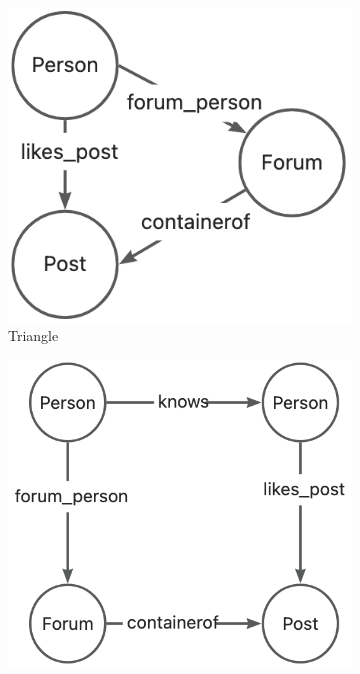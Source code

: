 \begin{figure}
    \centering
    \begin{subfigure}[b]{.3\linewidth}
        \centering
        \includegraphics[width=\linewidth]{./figures/exp/pattern-triangle.png}
        \caption{Triangle}
        \label{fig:exp-hard-triangle}
    \end{subfigure}
    \begin{subfigure}[b]{.3\linewidth}
        \centering
        \includegraphics[width=\linewidth]{./figures/exp/pattern-butterfly.png}

\end{subfigure}
\end{figure}
